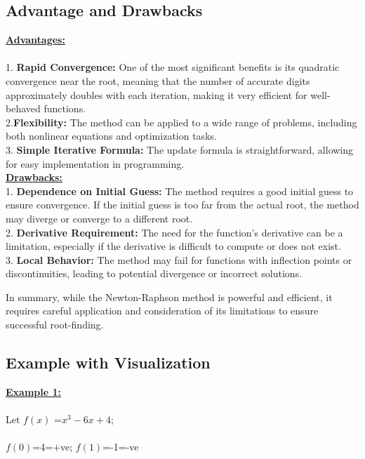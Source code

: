 \documentclass[12pt,a4paper]{article}
\begin{document}
	
	
	
	\newpage\subsection{Advantage and Drawbacks} 
	\textbf{\underline{Advantages:} }\\ \\ \vspace{0.5cm}
	1. \textbf{Rapid Convergence:} One of the most significant benefits is its quadratic convergence near the root, meaning that the number of accurate digits approximately doubles with each iteration, making it very efficient for well-behaved functions.\\
	
	2.\textbf{Flexibility:} The method can be applied to a wide range of problems, including both nonlinear equations and optimization tasks.\\
	
	3. \textbf{Simple Iterative Formula:} The update formula is straightforward, allowing for easy implementation in programming. \\
	
	\textbf{\underline{Drawbacks:} }\vspace{0.5cm}\\
	1. \textbf{Dependence on Initial Guess:} The method requires a good initial guess to ensure convergence. If the initial guess is too far from the actual root, the method may diverge or converge to a different root.\\
	
	2. \textbf{Derivative Requirement:} The need for the function’s derivative can be a limitation, especially if the derivative is difficult to compute or does not exist.\\
	
	3. \textbf{Local Behavior:} The method may fail for functions with inflection points or discontinuities, leading to potential divergence or incorrect solutions.
	
	In summary, while the Newton-Raphson method is powerful and efficient, it requires careful application and consideration of its limitations to ensure successful root-finding.
	\newpage\subsection{Example with Visualization} 
	
	
	\textbf{\underline{Example 1:}} \\ \\
	Let \(f(x)\) =$ x^{3}-6x+4;$ \\ \\
	  \(f(0)\)=4=+ve; \(f(1)\)=-1=-ve\\
	
\end{document}

